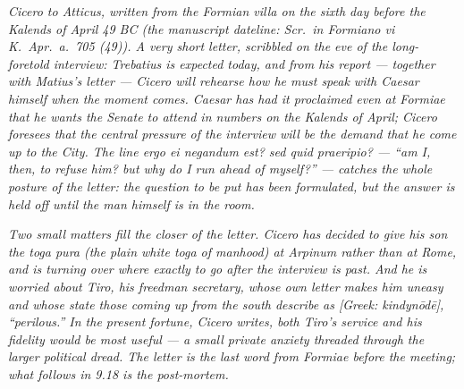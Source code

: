 
\textit{Cicero to Atticus, written from the Formian
villa on the sixth day before the Kalends of April 49 BC
(the manuscript dateline: \textit{Scr.\ in Formiano vi
K.\ Apr.\ a.\ 705 (49)}). A very short letter, scribbled
on the eve of the long-foretold interview: Trebatius is
expected today, and from his report --- together with
Matius's letter --- Cicero will rehearse how he must
speak with Caesar himself when the moment comes. Caesar
has had it proclaimed even at Formiae that he wants the
Senate to attend in numbers on the Kalends of April;
Cicero foresees that the central pressure of the
interview will be the demand that he come up to the
City. The line \textit{ergo ei negandum est? sed quid
praeripio?} --- ``am I, then, to refuse him? but why do
I run ahead of myself?'' --- catches the whole posture
of the letter: the question to be put has been
formulated, but the answer is held off until the man
himself is in the room.}

\textit{Two small matters fill the closer of the letter.
Cicero has decided to give his son the \textit{toga
pura} (the plain white toga of manhood) at Arpinum
rather than at Rome, and is turning over where exactly
to go after the interview is past. And he is worried
about Tiro, his freedman secretary, whose own letter
makes him uneasy and whose state those coming up from
the south describe as \textit{[Greek: kindyn\=od\=e]},
``perilous.'' In the present fortune, Cicero writes,
both Tiro's service and his fidelity would be most
useful --- a small private anxiety threaded through the
larger political dread. The letter is the last word
from Formiae before the meeting; what follows in 9.18
is the post-mortem.}
